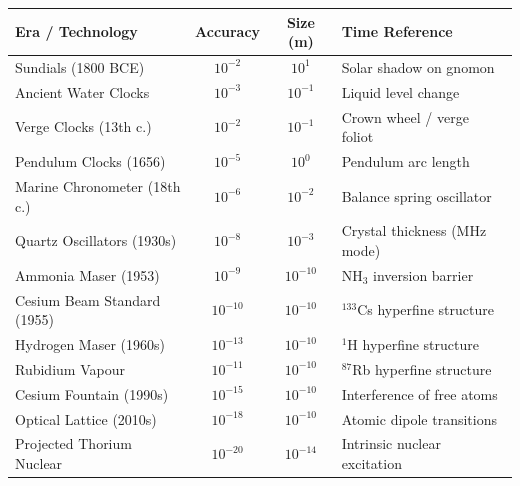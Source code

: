 \begin{historical}
\begin{tabular}{p{4.5cm} c c l}
\textbf{Era / Technology} & \textbf{Accuracy} & \textbf{Size (m)} & \textbf{Time Reference} \\ \hline
Sundials (1800 BCE) & $10^{-2}$ & $10^1$ & Solar shadow on gnomon \\
Ancient Water Clocks & $10^{-3}$ & $10^{-1}$ & Liquid level change \\
Verge Clocks (13th c.) & $10^{-2}$ & $10^{-1}$ & Crown wheel / verge foliot \\
Pendulum Clocks (1656) & $10^{-5}$ & $10^0$ & Pendulum arc length \\
Marine Chronometer (18th c.) & $10^{-6}$ & $10^{-2}$ & Balance spring oscillator \\
Quartz Oscillators (1930s) & $10^{-8}$ & $10^{-3}$ & Crystal thickness (MHz mode) \\
Ammonia Maser (1953) & $10^{-9}$ & $10^{-10}$ & NH$_3$ inversion barrier \\
Cesium Beam Standard (1955) & $10^{-10}$ & $10^{-10}$ & $^{133}$Cs hyperfine structure \\
Hydrogen Maser (1960s) & $10^{-13}$ & $10^{-10}$ & $^{1}$H hyperfine structure \\
Rubidium Vapour & $10^{-11}$ & $10^{-10}$ & $^{87}$Rb hyperfine structure \\
Cesium Fountain (1990s) & $10^{-15}$ & $10^{-10}$ & Interference of free atoms \\
Optical Lattice (2010s) & $10^{-18}$ & $10^{-10}$ & Atomic dipole transitions \\
Projected Thorium Nuclear & $10^{-20}$ & $10^{-14}$ & Intrinsic nuclear excitation \\
\end{tabular}

\end{historical}
